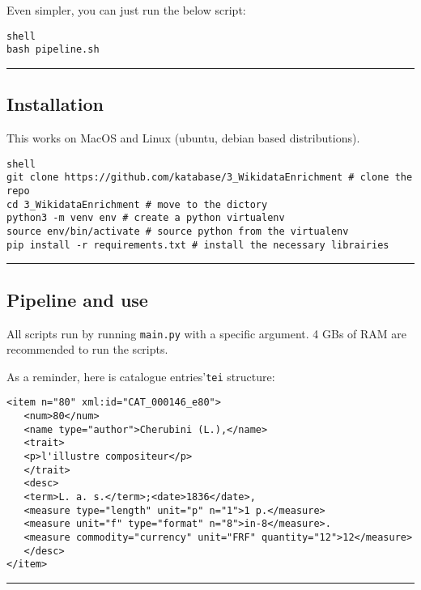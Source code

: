 Even simpler, you can just run the below script:

\begin{lstlisting}
shell
bash pipeline.sh
\end{lstlisting}

\par\noindent\rule{\linewidth}{0.4pt}
\subsection*{Installation}

This works on MacOS and Linux (ubuntu, debian based distributions).

\begin{lstlisting}
shell
git clone https://github.com/katabase/3_WikidataEnrichment # clone the repo
cd 3_WikidataEnrichment # move to the dictory
python3 -m venv env # create a python virtualenv
source env/bin/activate # source python from the virtualenv
pip install -r requirements.txt # install the necessary librairies
\end{lstlisting}

\par\noindent\rule{\linewidth}{0.4pt}
\subsection*{Pipeline and use}

All scripts run by running \texttt{main.py} with a specific argument. 4 GBs of RAM are recommended to
run the scripts. 

As a reminder, here is catalogue entries'\texttt{tei} 
structure:

\begin{listing}[h!]
   \begin{verbatim}
<item n="80" xml:id="CAT_000146_e80">
   <num>80</num>
   <name type="author">Cherubini (L.),</name>
   <trait>
   <p>l'illustre compositeur</p>
   </trait>
   <desc>
   <term>L. a. s.</term>;<date>1836</date>,
   <measure type="length" unit="p" n="1">1 p.</measure> 
   <measure unit="f" type="format" n="8">in-8</measure>.
   <measure commodity="currency" unit="FRF" quantity="12">12</measure>
   </desc>
</item>

   \end{verbatim}
\end{listing}

\par\noindent\rule{\linewidth}{0.4pt}

